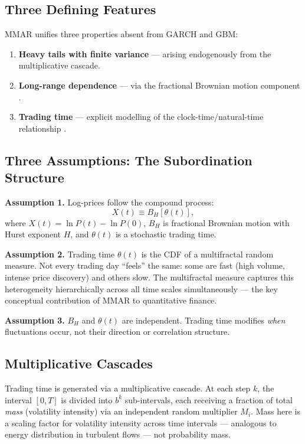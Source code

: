 \documentclass[12pt,a4paper]{article}
\begin{document}
\subsection{Three Defining Features}

MMAR \citep{mandelbrot1997} unifies three properties absent from GARCH
and GBM:
\begin{enumerate}
  \item \textbf{Heavy tails with finite variance} --- arising
    endogenously from the multiplicative cascade.
  \item \textbf{Long-range dependence} --- via the fractional Brownian
    motion component \citep{mandelbrotness1968}.
  \item \textbf{Trading time} --- explicit modelling of the
    clock-time/natural-time relationship \citep{mandelbrottaylor1967}.
\end{enumerate}

\subsection{Three Assumptions: The Subordination Structure}

\textbf{Assumption 1.} Log-prices follow the compound process:
\begin{equation}
  X(t) \equiv B_H[\theta(t)],
  \label{eq:mmar-subordination}
\end{equation}
where $X(t) = \ln P(t) - \ln P(0)$, $B_H$ is fractional Brownian
motion with Hurst exponent $H$, and $\theta(t)$ is a stochastic
trading time.

\textbf{Assumption 2.} Trading time $\theta(t)$ is the CDF of a
multifractal random measure. Not every trading day ``feels'' the same:
some are fast (high volume, intense price discovery) and others slow.
The multifractal measure captures this heterogeneity hierarchically
across all time scales simultaneously --- the key conceptual
contribution of MMAR to quantitative finance.

\textbf{Assumption 3.} $B_H$ and $\theta(t)$ are independent.
Trading time modifies \emph{when} fluctuations occur, not their
direction or correlation structure.

\subsection{Multiplicative Cascades}

Trading time is generated via a multiplicative cascade. At each step
$k$, the interval $[0,T]$ is divided into $b^k$ sub-intervals, each
receiving a fraction of total \emph{mass} (volatility intensity) via
an independent random multiplier $M_i$. Mass here is a scaling
factor for volatility intensity across time intervals --- analogous to
energy distribution in turbulent flows --- not probability mass.
\end{document}
